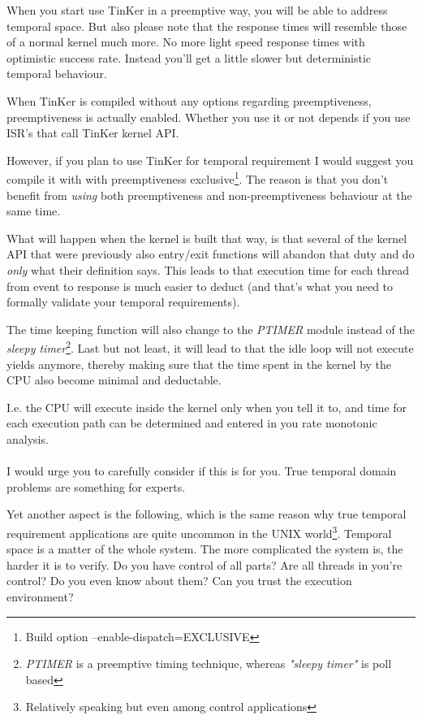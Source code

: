 When you start use TinKer in a preemptive way, you will be able to address temporal space. But also please note that the response times will resemble those of a normal kernel much more. No more light speed response times with optimistic success rate. Instead you'll get a little slower but deterministic temporal behaviour.

When TinKer is compiled without any options regarding preemptiveness, preemptiveness is actually enabled. Whether you use it or not depends if you use ISR's that call TinKer kernel API.

However, if you plan to use TinKer for temporal requirement I would suggest you compile it with with preemptiveness exclusive\footnote{Build option --enable-dispatch=EXCLUSIVE}. The reason is that you don't benefit from \textit{using} both preemptiveness and non-preemptiveness behaviour at the same time.

What will happen when the kernel is built that way, is that several of the kernel API that were previously also entry/exit functions will abandon that duty and do \textit{only} what their definition says. This leads to that execution time for each thread from event to response is much easier to deduct (and that's what you need to formally validate your temporal requirements).

The time keeping function will also change to the \textit{PTIMER} module instead of the \textit{sleepy timer}\footnote{\textit{PTIMER} is a preemptive timing technique, whereas \textit{"sleepy timer"} is poll based}. Last but not least, it will lead to that the idle loop will not execute yields anymore, thereby making sure that the time spent in the kernel by the CPU also become minimal and deductable. 

I.e. the CPU will execute inside the kernel only when you tell it to, and time for each execution path can be determined and entered in you rate monotonic analysis.
\\\\
I would urge you to carefully consider if this is for you. True temporal domain problems are something for experts.

Yet another aspect is the following, which is the same reason why true temporal requirement applications are quite uncommon in the UNIX world\footnote{Relatively speaking but even among control applications}. Temporal space is a matter of the whole system. The more complicated the system is, the harder it is to verify. Do you have control of all parts? Are all threads in you're control? Do you even know about them? Can you trust the execution environment?

